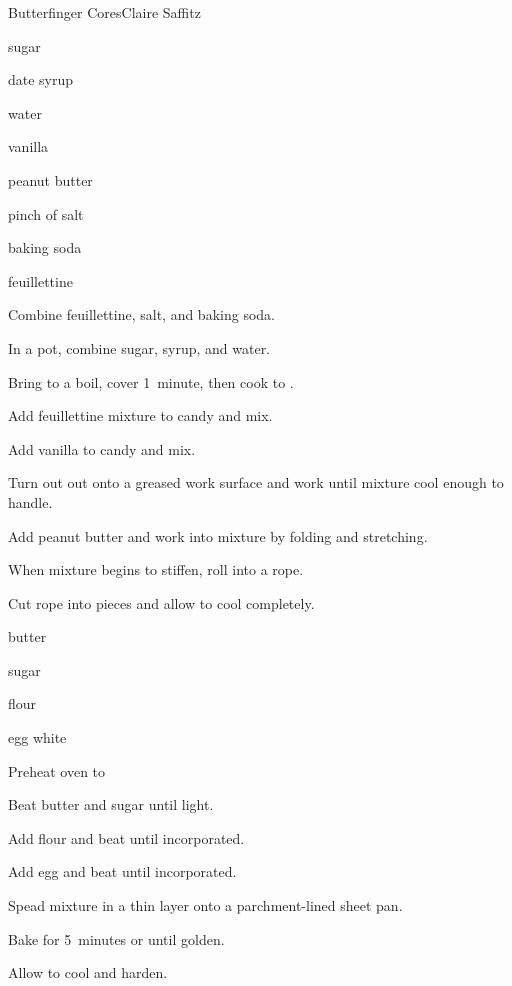 \begin{recipe}{Butterfinger Cores}{Claire Saffitz}{}

\begin{ingredients}
\item {} sugar
\item {} date syrup
\item {} water
\item {} vanilla
\item peanut butter
\item pinch of salt
\item {} baking soda
\item \C{\quarter} feuillettine
\end{ingredients}

\begin{directions}
\item Combine feuillettine, salt, and baking soda.
\item In a pot, combine sugar, syrup, and water.
\item Bring to a boil, cover 1~minute, then cook to .
\item Add feuillettine mixture to candy and mix.
\item Add vanilla to candy and mix.
\item Turn out out onto a greased work surface and work until mixture cool enough to handle.
\item Add peanut butter and work into mixture by folding and stretching.
\item When mixture begins to stiffen, roll into a rope.
\item Cut rope into pieces and allow to cool completely.
\end{directions}

\begin{ingredients}
\item {} butter
\item {} sugar
\item {} flour
\item {} egg white
\end{ingredients}

\begin{directions}
\item Preheat oven to 
\item Beat butter and sugar until light.
\item Add flour and beat until incorporated.
\item Add egg and beat until incorporated.
\item Spead mixture in a thin layer onto a parchment-lined sheet pan.
\item Bake for 5~minutes or until golden.
\item Allow to cool and harden.
\end{directions}

\end{recipe}
